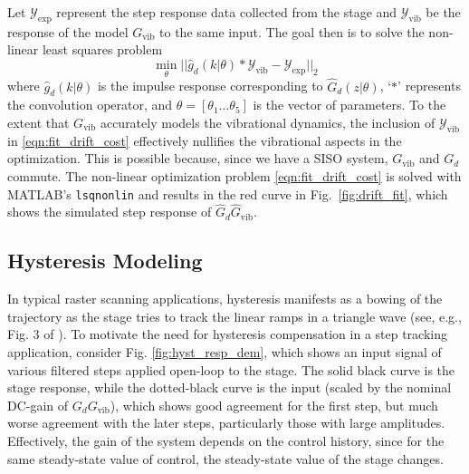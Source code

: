 \documentclass[twocolumn,twoside]{IEEEtran}
\newcommand{\Gv}{\ensuremath{G_{\text{vib}}}\xspace}
\newcommand{\hGv}{\ensuremath{\hat{G}_{\text{vib}}}\xspace}
\begin{document}
Let $\mathcal{Y}_{\text{exp}}$ represent the step response data collected from the stage and  $\mathcal{Y}_{\text{vib}}$ be the response of the model $\Gv$ to the same input. The goal then is to solve the non-linear least squares problem
\begin{equation}
  \min_{\theta}\bigl|\bigl| \hat{g}_d(k|\theta)*\mathcal{Y}_{\text{vib}} - \mathcal{Y}_{\text{exp}}\bigr|\bigr|_2
  \label{eqn:fit_drift_cost}
\end{equation}
where $\hat{g}_d(k|\theta)$ is the impulse response corresponding to $\hat{G}_d(z|\theta)$, `$*$' represents the convolution operator, and  ${\theta=[\theta_1\dots\theta_5]}$ is the vector of parameters. To the extent that $\Gv$ accurately models the vibrational dynamics, the inclusion of $\mathcal{Y}_{\text{vib}}$ in \eqref{eqn:fit_drift_cost} effectively nullifies the vibrational aspects in the optimization. This is possible because, since we have a SISO system, $\Gv$ and $G_d$ commute. 
The non-linear optimization problem \eqref{eqn:fit_drift_cost} is solved with MATLAB's \texttt{lsqnonlin} and results in the red curve in Fig.~\ref{fig:drift_fit}, which shows the simulated step response of $\hat{G}_d\hGv$. 

\subsection{Hysteresis Modeling}\label{sec:hyst_model}
In typical raster scanning applications, hysteresis manifests as a bowing of the trajectory as the stage tries to track the linear ramps in a triangle wave (see, e.g., Fig. 3 of \cite{Leang_IEEECS_2009}). To motivate the need for hysteresis compensation in a step tracking application, consider Fig. \ref{fig:hyst_resp_dem}, which shows an input signal of various filtered steps applied open-loop to the stage. The solid black curve is the stage response, while the dotted-black curve is the input (scaled by the nominal DC-gain of $G_d\Gv$), which shows good agreement for the first step, but much worse agreement with the later steps, particularly those with large amplitudes. Effectively, the gain of the system depends on the control history, since for the same steady-state value of control, the steady-state value of the stage changes.
\end{document}
